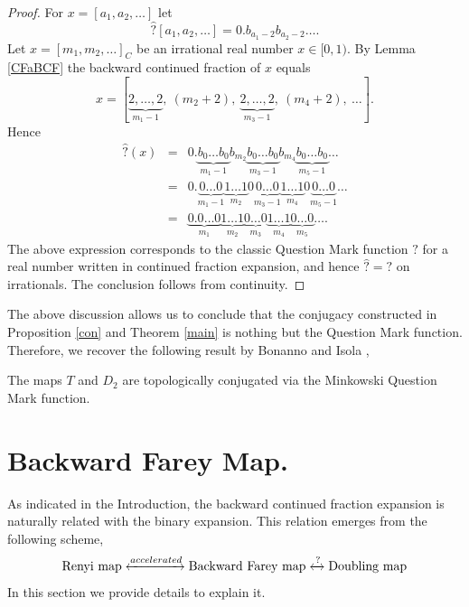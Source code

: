 \documentclass[letterpaper,10pt,reqno]{amsart}
\numberwithin{equation}{section}     %
\begin{document}
\begin{proof} For  $x= [a_1, a_2, \dots ]$ let
\[
\hat ?[a_1, a_2, \dots]=0.b_{a_1-2}b_{a_2-2}\dots . 
\]
Let $x=[m_1, m_2, \dots]_{C}$ be an irrational real number $x\in [0,1)$. By Lemma \ref{CFaBCF}   the backward continued fraction of $x$ equals 
\[
x=[\underbrace{2,\dots, 2}_{m_1-1}, \ (m_2+2),\  \underbrace{2,\dots, 2}_{m_3-1},\  (m_4+2), \  \dots].
\]
Hence
\begin{eqnarray*}
\hat ?(x)&=&0.\underbrace{b_0\dots b_0}_{m_1-1} b_{m_2} \underbrace{b_0\dots b_0}_{m_3-1}b_{m_4}\underbrace{b_0\dots b_0}_{m_5-1}\dots\\
&=&0.\underbrace{0\dots 0}_{m_1-1} \underbrace{1\dots 1}_{m_2}0 \underbrace{0\dots 0}_{m_3-1}\underbrace{1\dots 1}_{m_4}0 \underbrace{0\dots 0}_{m_5-1}\dots\\
&=&\underbrace{0.0\dots 0}_{m_1} \underbrace{1\dots 1}_{m_2} \underbrace{0\dots 0}_{m_3}\underbrace{1\dots 1}_{m_4} \underbrace{0\dots 0}_{m_5}\dots .
\end{eqnarray*}
The above expression corresponds to the classic Question Mark function $?$ for a real number written in continued fraction expansion, and hence $\hat ?=?$ on irrationals. The conclusion follows from continuity.  
\end{proof}
The above discussion allows us to conclude that the conjugacy constructed in Proposition \ref{con} and Theorem \ref{main} is nothing but the Question Mark function. Therefore, we recover the following result by Bonanno and Isola \cite[Theorem 2.3]{bi},
\begin{proposition}
The maps $T$ and $D_2$ are topologically conjugated via the Minkowski Question Mark function.
\end{proposition}






\section{Backward Farey Map.} \label{epi}
As indicated  in the Introduction,  the backward continued fraction expansion is naturally related with the binary expansion. This relation emerges from the following scheme,
\begin{equation*}
\text{Renyi map} \xleftrightarrow{accelerated} \text{Backward Farey map} \xleftrightarrow{?} \text{Doubling map}
\end{equation*}
In this section we provide details to explain it.
\end{document}
